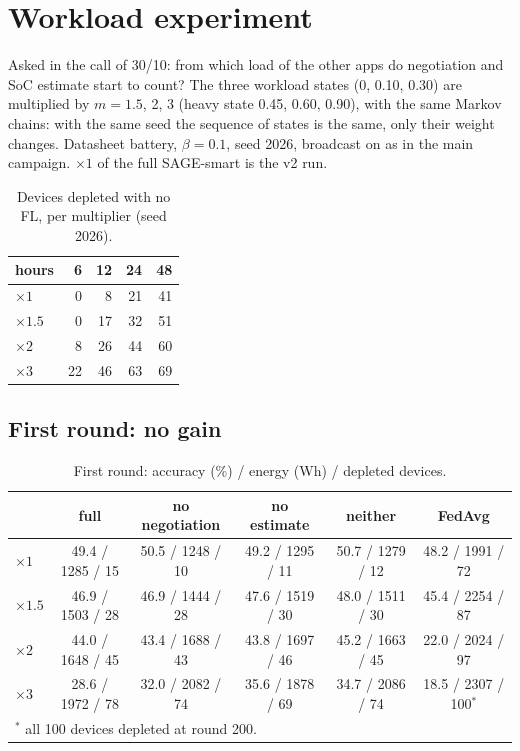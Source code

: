 \documentclass[11pt,a4paper]{article}
\begin{document}
\section{Workload experiment}
\label{sec:workload}

Asked in the call of 30/10: from which load of the other apps do negotiation
and SoC estimate start to count? The three workload states (0, 0.10, 0.30) are
multiplied by $m=1.5$, 2, 3 (heavy state 0.45, 0.60, 0.90), with the same
Markov chains: with the same seed the sequence of states is the same, only
their weight changes. Datasheet battery, $\beta=0.1$, seed 2026, broadcast on as
in the main campaign. $\times1$ of the full SAGE-smart is the v2 run.

\begin{table}[H]
\centering
\small
\caption{Devices depleted with no FL, per multiplier (seed 2026).}
\label{tab:nofl_wl}
\begin{tabular}{lrrrr}
\toprule
hours & 6 & 12 & 24 & 48 \\
\midrule
$\times1$   & 0  & 8  & 21 & 41 \\
$\times1.5$ & 0  & 17 & 32 & 51 \\
$\times2$   & 8  & 26 & 44 & 60 \\
$\times3$   & 22 & 46 & 63 & 69 \\
\bottomrule
\end{tabular}
\end{table}

\subsection{First round: no gain}

\begin{table}[H]
\centering
\footnotesize
\caption{First round: accuracy (\%) / energy (Wh) / depleted devices.}
\label{tab:wl1}
\setlength{\tabcolsep}{4pt}
\begin{tabular}{lccccc}
\toprule
& full & no negotiation & no estimate & neither & FedAvg \\
\midrule
$\times1$   & 49.4 / 1285 / 15 & 50.5 / 1248 / 10 & 49.2 / 1295 / 11 & 50.7 / 1279 / 12 & 48.2 / 1991 / \phantom{0}72 \\
$\times1.5$ & 46.9 / 1503 / 28 & 46.9 / 1444 / 28 & 47.6 / 1519 / 30 & 48.0 / 1511 / 30 & 45.4 / 2254 / \phantom{0}87 \\
$\times2$   & 44.0 / 1648 / 45 & 43.4 / 1688 / 43 & 43.8 / 1697 / 46 & 45.2 / 1663 / 45 & 22.0 / 2024 / \phantom{0}97 \\
$\times3$   & 28.6 / 1972 / 78 & 32.0 / 2082 / 74 & 35.6 / 1878 / 69 & 34.7 / 2086 / 74 & 18.5 / 2307 / 100$^{*}$ \\
\bottomrule
\multicolumn{6}{l}{\footnotesize $^{*}$ all 100 devices depleted at round 200.}
\end{tabular}
\end{table}
\end{document}
